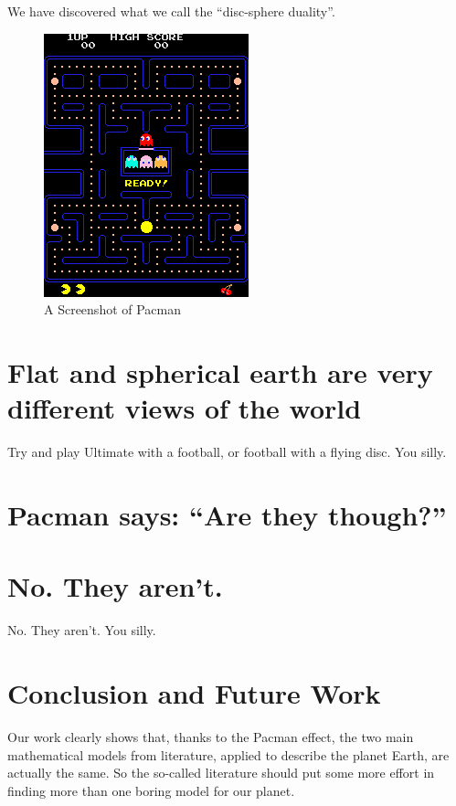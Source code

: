 \documentclass{article}
\begin{document}
We have discovered what we call the ``disc-sphere duality''.

\begin{figure}[ht]
  \centering
  \includegraphics{images/pacman.png}
  \caption{A Screenshot of Pacman}
  \label{fig:pacman-screenshot}
\end{figure}

\section{Flat and spherical earth are very different views of the world}
Try and play Ultimate with a football, or football with a flying disc. You silly.
\section{Pacman says: ``Are they though?''}
\begin{figure}[H]
\end{figure}
\section{No. They aren't.}
No. They aren't. You silly.
\section{Conclusion and Future Work}
Our work clearly shows that, thanks to the Pacman effect, the two main mathematical models from literature, applied to describe the planet Earth, are actually the same. So the so-called literature should put some more effort in finding more than one boring model for our planet.
\end{document}
